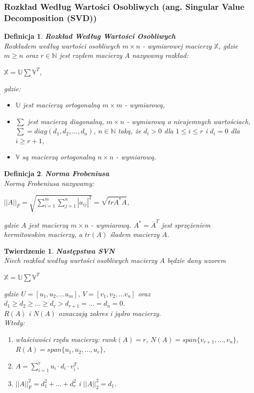 \documentclass[12pt,a4paper]{report}
\newtheorem{df}{Definicja}
\newtheorem{tw}{Twierdzenie}
\begin{document}
\subsubsection{Rozkład Według Wartości Osobliwych (ang. Singular Value Decomposition (SVD))} 
\begin{df} \textbf{Rozkład Według Wartości Osobliwych}%
\\Rozkładem według wartości osobliwych $m\times n$ - wymiarowej macierzy $\mathbb{X}$, gdzie $m\geq n$ oraz $r \in \mathbb{N}$ jest rzędem macierzy $A$ nazywamy rozkład:
\begin{center}
$\mathbb{X}=\mathbb{U}\sum \mathbb{V}^T$,
\end{center}  
gdzie:
\begin{itemize}
\item $\mathbb{U}$ jest macierzą ortogonalną $m \times m$ - wymiarową,
\item $\sum $ jest macierzą diagonalną, $m \times n$ - wymiarową o nieujemnych wartościach, $\sum = diag(d_1, d_2,..., d_n)$, $n \in \mathbb{N}$ taką, że $d_i>0$ dla $1\leq i \leq r$ i $d_i=0$ dla $i\geq r+1$,
\item $\mathbb{V}$ są macierzą ortogonalną $n \times n$ - wymiarową.
\end{itemize}
\end{df}
\begin{df}\textbf{Norma Frobeniusa}%
\\Normą Frobeniusa nazywamy:
\begin{center}
$||A||_F = \sqrt{\sum_{i=1}^m \sum_{j=1}^n |a_{ij}|^2} = \sqrt{tr A^* A}$,
\end{center}
gdzie $A$ jest macierzą $m\times n$ - wymiarową. $A^* = \overline{A}^T$ jest sprzężeniem hermitowskim macierzy, a $tr(A)$ śladem macierzy $A$.
\end{df}

\begin{tw}\textbf{Następstwa SVN}%
\\Niech rozkład według wartości osobliwych macierzy $A$ będzie dany wzorem
\begin{center}
$\mathbb{X}=\mathbb{U}\sum \mathbb{V}^T$
\end{center}
gdzie $U=[u_1,u_2,...u_m]$, $V = [v_1,v_2,...v_n]$ oraz 
\\$d_1\geq d_2 \geq ... \geq d_r > d_{r+1} = ... = d_n = 0$.
\\$R(A)$ i $N(A)$ oznaczają zakres i jądro macierzy.
\\Wtedy:
\begin{enumerate}
\item właściwości rzędu macierzy: $rank(A) = r$, $N(A) = span\{v_{r+1},...,v_n \}$, $R(A) = span \{u_1,u_2,...,u_r \}$,
\item $A = \sum_{i=1}^r u_i \cdot d_i \cdot v_i^T$,
\item $||A||_F^2 = d_1^2+...+d_r^2$ i $||A||_2^2 = d_1$.
\end{enumerate}
\end{tw}
\end{document}

